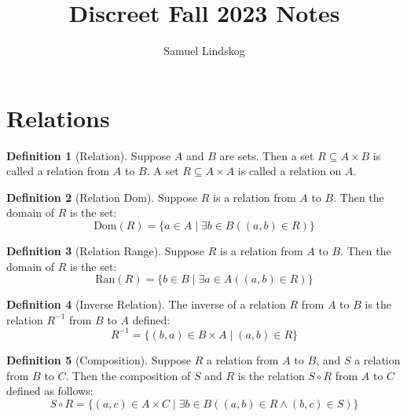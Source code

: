 \documentclass[nobib,notoc]{tufte-handout}
\begin{document}
\theoremstyle{definition}\newtheorem{defi}{Definition}[section]
\theoremstyle{definition}\newtheorem{thm}{Theorem}[section]
\theoremstyle{definition}\newtheorem{cor}{Corollary}[section]
\theoremstyle{definition}\newtheorem{lem}{Lemma}[section]
\theoremstyle{remark}\newtheorem*{notat}{Notation}

\title{Discreet Fall 2023 Notes}
\author{Samuel Lindskog}
\maketitle

\setcounter{section}{1}
\setcounter{tocdepth}{1}

\section{Relations}
\begin{defi}[Relation]
	Suppose \(A\) and \(B\) are sets. Then a set \(R\subseteq A\times B\) is called a relation from \(A\) to \(B\). A set \(R\subseteq A\times A\) is called a relation on \(A\).
\end{defi}
\begin{defi}[Relation Dom]
	Suppose \(R\) is a relation from \(A\) to \(B\). Then the domain of \(R\) is the set:
	\begin{equation*}
		\text{Dom}(R)=\{a\in A\mid\exists b\in B((a,b)\in R)\}
	\end{equation*}
\end{defi}
\begin{defi}[Relation Range]
	Suppose \(R\) is a relation from \(A\) to \(B\). Then the domain of \(R\) is the set:
	\begin{equation*}
		\text{Ran}(R)=\{b\in B\mid\exists a\in A((a,b)\in R)\}
	\end{equation*}
\end{defi}
\begin{defi}[Inverse Relation]
	The inverse of a relation \(R\) from \(A\) to \(B\) is the relation \(R^{-1}\) from \(B\) to \(A\) defined:
	\begin{equation*}
		R^{-1}=\{(b,a)\in B\times A\mid (a,b)\in R\}
	\end{equation*}
\end{defi}
\begin{defi}[Composition]
	Suppose \(R\) a relation from \(A\) to \(B\), and \(S\) a relation from \(B\) to \(C\). Then the composition of \(S\) and \(R\) is the relation \(S\circ R\) from \(A\) to \(C\) defined as follows:
	\begin{equation*}
		S\circ R=\{(a,c)\in A\times C\mid\exists b\in B((a,b)\in R\wedge (b,c)\in S)\}
	\end{equation*}
\end{defi}
\end{document}
